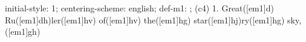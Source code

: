 initial-style: 1;
centering-scheme: english;
def-m1: \grealign;
(c4) 1. Great([em1]d) Ru([em1]dh)ler([em1]hv) of([em1]hv) the([em1]hg) star([em1]hj)ry([em1]hg) sky,([em1]gh)